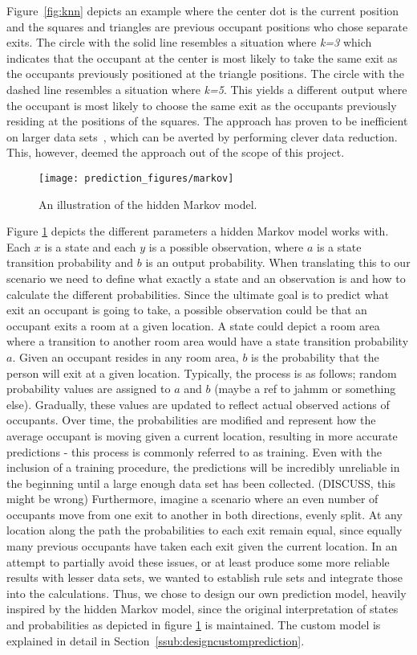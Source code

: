 Figure~\ref{fig:knn} depicts an example where the center dot is the current position and the squares and triangles are previous occupant positions who chose separate exits. The circle with the solid line resembles a situation where \emph{k=3} which indicates that the occupant at the center is most likely to take the same exit as the occupants previously positioned at the triangle positions. The circle with the dashed line resembles a situation where \emph{k=5}. This yields a different output where the occupant is most likely to choose the same exit as the occupants previously residing at the positions of the squares. The approach has proven to be inefficient on larger data sets~\cite{bhatia}, which can be averted by performing clever data reduction. This, however, deemed the approach out of the scope of this project.
\begin{figure}
\centering
\texttt{[image: prediction\_figures/markov]}
\caption{An illustration of the hidden Markov model.}
\label{fig:markov}
\end{figure}

Figure \ref{fig:markov} depicts the different parameters a hidden Markov model works with. Each \(x\) is a state and each \(y\) is a possible observation, where \(a\) is a state transition probability and \(b\) is an output probability. When translating this to our scenario we need to define what exactly a state and an observation is and how to calculate the different probabilities. Since the ultimate goal is to predict what exit an occupant is going to take, a possible observation could be that an occupant exits a room at a given location. A state could depict a room area where a transition to another room area would have a state transition probability \(a\). Given an occupant resides in any room area, \(b\) is the probability that the person will exit at a given location. Typically, the process is as follows; random probability values are assigned to \(a\) and \(b\) (maybe a ref to jahmm or something else). Gradually, these values are updated to reflect actual observed actions of occupants. Over time, the probabilities are modified and represent how the average occupant is moving given a current location, resulting in more accurate predictions - this process is commonly referred to as training. Even with the inclusion of a training procedure, the predictions will be incredibly unreliable in the beginning until a large enough data set has been collected. (DISCUSS, this might be wrong) Furthermore, imagine a scenario where an even number of occupants move from one exit to another in both directions, evenly split. At any location along the path the probabilities to each exit remain equal, since equally many previous occupants have taken each exit given the current location. In an attempt to partially avoid these issues, or at least produce some more reliable results with lesser data sets, we wanted to establish rule sets and integrate those into the calculations. Thus, we chose to design our own prediction model, heavily inspired by the hidden Markov model, since the original interpretation of states and probabilities as depicted in figure \ref{fig:markov} is maintained. The custom model is explained in detail in Section~\ref{ssub:designcustomprediction}. 